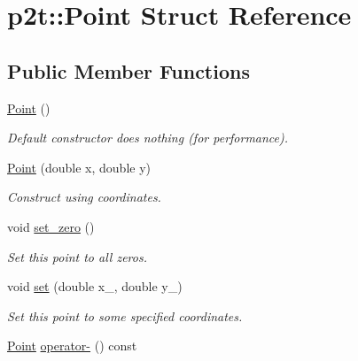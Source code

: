 \hypertarget{structp2t_1_1_point}{\section{p2t\+:\+:Point Struct Reference}
\label{structp2t_1_1_point}
}
\subsection*{Public Member Functions}
\begin{DoxyCompactItemize}
\item 
\hypertarget{structp2t_1_1_point_a7e573e8b3c263b088a2141d4977850b7}{\hyperlink{structp2t_1_1_point_a7e573e8b3c263b088a2141d4977850b7}{Point} ()}\label{structp2t_1_1_point_a7e573e8b3c263b088a2141d4977850b7}

\begin{DoxyCompactList}\small\item\em Default constructor does nothing (for performance). \end{DoxyCompactList}\item 
\hypertarget{structp2t_1_1_point_a60c0ed4b0d109b9172a50555220ebdc3}{\hyperlink{structp2t_1_1_point_a60c0ed4b0d109b9172a50555220ebdc3}{Point} (double x, double y)}\label{structp2t_1_1_point_a60c0ed4b0d109b9172a50555220ebdc3}

\begin{DoxyCompactList}\small\item\em Construct using coordinates. \end{DoxyCompactList}\item 
\hypertarget{structp2t_1_1_point_ac0b05395a17be952b6ea580495c9d11b}{void \hyperlink{structp2t_1_1_point_ac0b05395a17be952b6ea580495c9d11b}{set\+\_\+zero} ()}\label{structp2t_1_1_point_ac0b05395a17be952b6ea580495c9d11b}

\begin{DoxyCompactList}\small\item\em Set this point to all zeros. \end{DoxyCompactList}\item 
\hypertarget{structp2t_1_1_point_aa8a3a62cc47e65e0f717679adf12fd4e}{void \hyperlink{structp2t_1_1_point_aa8a3a62cc47e65e0f717679adf12fd4e}{set} (double x\+\_\+, double y\+\_\+)}\label{structp2t_1_1_point_aa8a3a62cc47e65e0f717679adf12fd4e}

\begin{DoxyCompactList}\small\item\em Set this point to some specified coordinates. \end{DoxyCompactList}\item 
\hypertarget{structp2t_1_1_point_a64b9a6ab804f3dd940d88aedcde92b41}{\hyperlink{structp2t_1_1_point}{Point} \hyperlink{structp2t_1_1_point_a64b9a6ab804f3dd940d88aedcde92b41}{operator-\/} () const }\label{structp2t_1_1_point_a64b9a6ab804f3dd940d88aedcde92b41}


\end{DoxyCompactItemize}
